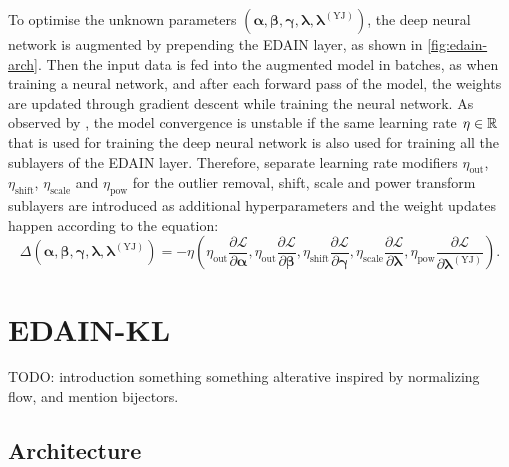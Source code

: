 \documentclass{statsmsc}
\begin{document}
To optimise the unknown parameters
$\left( \bm{\alpha}, \bm{\beta}, \bm{\gamma}, \bm{\lambda}, \bm{\lambda}^{(\textrm{YJ})}\right)$,
the deep neural network is augmented by prepending the \ac{EDAIN} layer, as shown in
\cref{fig:edain-arch}. Then the input data is fed into the augmented model in batches,
as when training a neural network, and after each forward pass of the model, the weights
are updated through gradient descent while training the neural network.
As observed by \citeauthor{dain}, the model convergence is unstable if the same learning rate
$\eta \in \mathbb{R}$ that is used for training the deep neural network is also used for training all
the sublayers of the \ac{EDAIN} layer. Therefore, separate learning rate modifiers
$\eta_{\textrm{out}}$,
$\eta_{\textrm{shift}}$,
$\eta_{\textrm{scale}}$ and
$\eta_{\textrm{pow}}$ for the outlier removal, shift, scale and power transform sublayers are
introduced as additional hyperparameters and the weight updates happen according to the equation:
\begin{equation}
    \Delta \left( \bm{\alpha}, \bm{\beta}, \bm{\gamma}, \bm{\lambda}, \bm{\lambda}^{(\textrm{YJ})}\right)
    =
    -\eta\left(
        \eta_{\textrm{out}} \frac{\partial \mathcal{L}}{\partial \bm\alpha},
        \eta_{\textrm{out}} \frac{\partial \mathcal{L}}{\partial \bm\beta},
        \eta_{\textrm{shift}} \frac{\partial \mathcal{L}}{\partial \bm\gamma},
        \eta_{\textrm{scale}} \frac{\partial \mathcal{L}}{\partial \bm\lambda},
        \eta_{\textrm{pow}} \frac{\partial \mathcal{L}}{\partial \bm{\lambda}^{(\textrm{YJ})}}
    \right).
\end{equation}




\section{EDAIN-KL}%
\label{sec:EDAIN-KL-method}

TODO: introduction
something something alterative inspired by normalizing flow, and mention bijectors.

\subsection{Architecture}%
\label{sub:Architecture}
\end{document}
